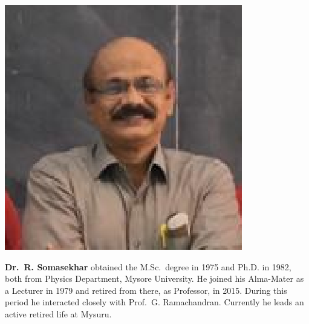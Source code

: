 \centerline{\includegraphics[scale=.8]{authorsphotos/Somasekhar.eps}}
\bigskip

\noindent
\textbf{Dr.\ R. Somasekhar} obtained the M.Sc.\ degree in 1975 and Ph.D. in 1982, both from Physics Department, Mysore University. 
He joined his Alma-Mater as a Lecturer in 1979 and retired from there, as Professor, in 2015. During this period he interacted closely with 
Prof.\ G. Ramachandran. Currently he leads an active retired life at Mysuru.

